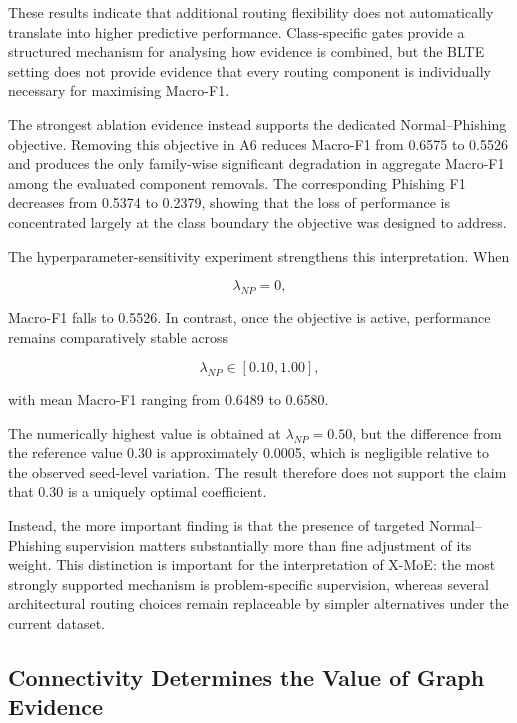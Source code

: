\documentclass{ieeeaccess}
\begin{document}
These results indicate that additional routing flexibility does not automatically translate into higher predictive performance. Class-specific gates provide a structured mechanism for analysing how evidence is combined, but the BLTE setting does not provide evidence that every routing component is individually necessary for maximising Macro-F1.

The strongest ablation evidence instead supports the dedicated Normal--Phishing objective. Removing this objective in A6 reduces Macro-F1 from 0.6575 to 0.5526 and produces the only family-wise significant degradation in aggregate Macro-F1 among the evaluated component removals. The corresponding Phishing F1 decreases from 0.5374 to 0.2379, showing that the loss of performance is concentrated largely at the class boundary the objective was designed to address.

The hyperparameter-sensitivity experiment strengthens this interpretation. When

\begin{equation}
\lambda_{NP}=0,
\end{equation}

Macro-F1 falls to 0.5526. In contrast, once the objective is active, performance remains comparatively stable across

\begin{equation}
\lambda_{NP}\in[0.10,1.00],
\end{equation}

with mean Macro-F1 ranging from 0.6489 to 0.6580.

The numerically highest value is obtained at \(\lambda_{NP}=0.50\), but the difference from the reference value 0.30 is approximately 0.0005, which is negligible relative to the observed seed-level variation. The result therefore does not support the claim that 0.30 is a uniquely optimal coefficient.

Instead, the more important finding is that the presence of targeted Normal--Phishing supervision matters substantially more than fine adjustment of its weight. This distinction is important for the interpretation of X-MoE: the most strongly supported mechanism is problem-specific supervision, whereas several architectural routing choices remain replaceable by simpler alternatives under the current dataset.


\subsection{Connectivity Determines the Value of Graph Evidence}
\end{document}
